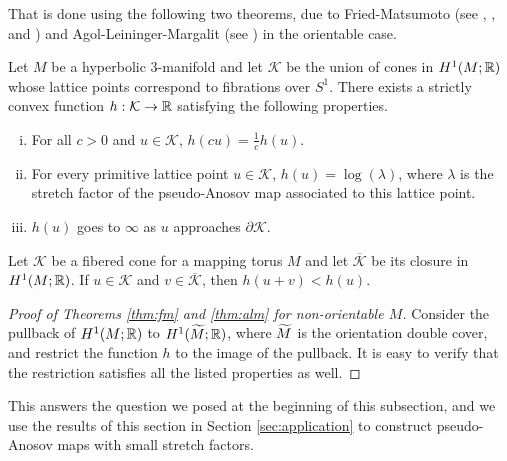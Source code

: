 That is done using the following two theorems, due to Fried-Matsumoto (see \cite{fried1982flow}, \cite{fried1983transitive}, and \cite{matsumoto1987topological}) and Agol-Leininger-Margalit (see \cite{agol6983pseudo}) in the orientable case.

\begin{thm}
  \label{thm:fm}
  Let $M$ be a hyperbolic $3$-manifold and let $\mathcal{K}$ be the union of cones in $H^1(M; \mathbb{R})$ whose lattice points correspond to fibrations over $S^1$.
  There exists a strictly convex function $h: \mathcal{K} \to \mathbb{R}$ satisfying the following properties.
  \begin{enumerate}[(i)]
  \item For all $c > 0$ and $u \in \mathcal{K}$, $h(cu) =  \frac{1}{c}h(u)$.
  \item For every primitive lattice point $u \in \mathcal{K}$, $h(u) = \log(\lambda)$, where $\lambda$ is the
    stretch factor of the pseudo-Anosov map associated to this lattice point.
  \item $h(u)$ goes to $\infty$ as $u$ approaches $\partial \mathcal{K}$.
  \end{enumerate}
\end{thm}

\begin{thm}
  \label{thm:alm}
  Let $\mathcal{K}$ be a fibered cone for a mapping torus $M$ and let $\overline{\mathcal{K}}$ be its closure
  in $H^1(M;\mathbb{R})$. If $u \in \mathcal{K}$ and $v \in \overline{\mathcal{K}}$, then $h(u+v) < h(u)$.
\end{thm}

\begin{proof}[Proof of Theorems \ref{thm:fm} and \ref{thm:alm} for non-orientable $M$]
Consider the pullback of $H^1(M; \mathbb{R})$ to $H^1(\widetilde{M}; \mathbb{R})$, where $\widetilde{M}$ is the orientation double cover, and restrict the function $h$ to the image of the pullback.
It is easy to verify that the restriction satisfies all the listed properties as well.
\end{proof}

This answers the question we posed at the beginning of this subsection, and we use the results of this section in Section \ref{sec:application} to construct pseudo-Anosov maps with small stretch factors.
